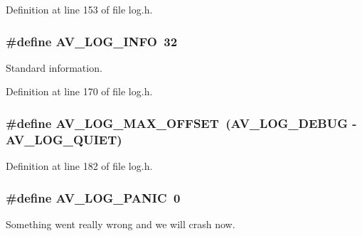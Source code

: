Definition at line 153 of file log.\+h.

\subsubsection[{\texorpdfstring{A\+V\+\_\+\+L\+O\+G\+\_\+\+I\+N\+FO}{AV_LOG_INFO}}]{\setlength{\rightskip}{0pt plus 5cm}\#define A\+V\+\_\+\+L\+O\+G\+\_\+\+I\+N\+FO~32}\hypertarget{group__lavu__log__constants_gad172eacfed8653e454c6fdcbe53baab3}{}\label{group__lavu__log__constants_gad172eacfed8653e454c6fdcbe53baab3}
Standard information. 

Definition at line 170 of file log.\+h.

\subsubsection[{\texorpdfstring{A\+V\+\_\+\+L\+O\+G\+\_\+\+M\+A\+X\+\_\+\+O\+F\+F\+S\+ET}{AV_LOG_MAX_OFFSET}}]{\setlength{\rightskip}{0pt plus 5cm}\#define A\+V\+\_\+\+L\+O\+G\+\_\+\+M\+A\+X\+\_\+\+O\+F\+F\+S\+ET~({\bf A\+V\+\_\+\+L\+O\+G\+\_\+\+D\+E\+B\+UG} -\/ {\bf A\+V\+\_\+\+L\+O\+G\+\_\+\+Q\+U\+I\+ET})}\hypertarget{group__lavu__log__constants_gad87b54332d00f280bf5db0fd2f56f340}{}\label{group__lavu__log__constants_gad87b54332d00f280bf5db0fd2f56f340}


Definition at line 182 of file log.\+h.

\subsubsection[{\texorpdfstring{A\+V\+\_\+\+L\+O\+G\+\_\+\+P\+A\+N\+IC}{AV_LOG_PANIC}}]{\setlength{\rightskip}{0pt plus 5cm}\#define A\+V\+\_\+\+L\+O\+G\+\_\+\+P\+A\+N\+IC~0}\hypertarget{group__lavu__log__constants_ga09623098406ba81d130824ac742d146e}{}\label{group__lavu__log__constants_ga09623098406ba81d130824ac742d146e}
Something went really wrong and we will crash now. 

